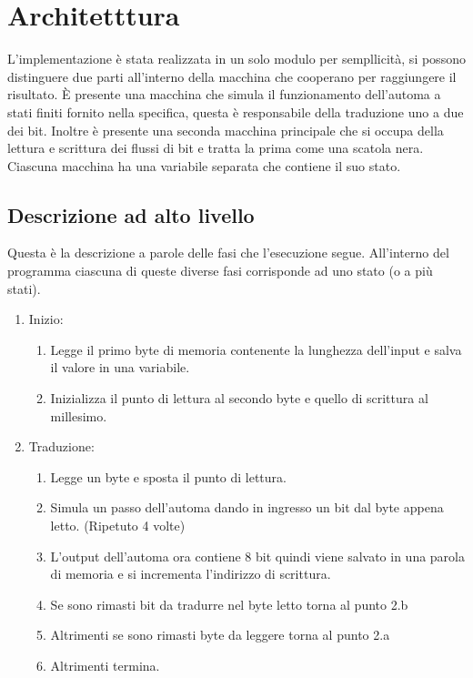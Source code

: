\documentclass{article}
\begin{document}
\section{Architetttura}
L'implementazione è stata realizzata in un solo modulo per sempllicità, si possono distinguere due parti all'interno della macchina che cooperano per raggiungere il risultato. È presente una macchina che simula il funzionamento dell'automa a stati finiti fornito nella specifica, questa è responsabile della traduzione uno a due dei bit. Inoltre è presente una seconda macchina principale che si occupa della lettura e scrittura dei flussi di bit e tratta la prima come una scatola nera. Ciascuna macchina ha una variabile separata che contiene il suo stato.

\subsection{Descrizione ad alto livello}
Questa è la descrizione a parole delle fasi che l'esecuzione segue. All'interno del programma ciascuna di queste diverse fasi corrisponde ad uno stato (o a più stati).

\begin{enumerate}
	\item Inizio:
	\begin{enumerate}
		\item Legge il primo byte di memoria contenente la lunghezza dell'input e salva il valore in una variabile.
		\item Inizializza il punto di lettura al secondo byte e quello di scrittura al millesimo.
	\end{enumerate}
	\item Traduzione:
	\begin{enumerate}
		\item Legge un byte e sposta il punto di lettura.
		\item Simula un passo dell'automa dando in ingresso un bit dal byte appena letto. (Ripetuto 4 volte)
		\item L'output dell'automa ora contiene 8 bit quindi viene salvato in una parola di memoria e si incrementa l'indirizzo di scrittura.
		\item Se sono rimasti bit da tradurre nel byte letto torna al punto 2.b
		\item Altrimenti se sono rimasti byte da leggere torna al punto 2.a
		\item Altrimenti termina.
	\end{enumerate}
\end{enumerate}
\end{document}
